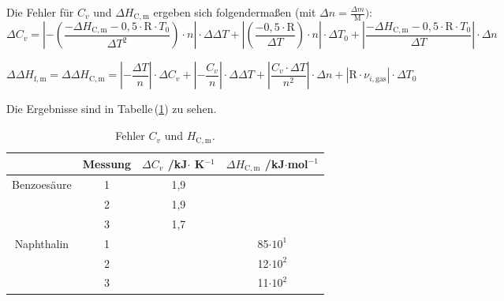 \documentclass[12pt,a4paper,titlepage,headinclude,bibtotoc]{scrartcl}
\begin{document}
Die Fehler für $C_{v}$ und $\Delta H_\mathrm{C,m}$  ergeben sich folgendermaßen (mit $\Delta n= \frac{\Delta m}{\mathrm{M}})$:\\

\begin{equation}
\Delta C_{v}= \left|-\left(\frac{-\Delta H_\mathrm{C,m}-0,5 \cdot \mathrm{R}\cdot T_0}{\Delta T^2}\right) \cdot n\right|\cdot \Delta \Delta T + \left|\left(\frac{-0,5 \cdot \mathrm{R}}{\Delta T}\right) \cdot n\right| \cdot \Delta T_0+ \left|\frac{-\Delta H_\mathrm{C,m}-0,5 \cdot \mathrm{R}\cdot T_0}{\Delta T}\right|\cdot \Delta n
\end{equation}


\begin{equation}
\Delta \Delta H_\mathrm{f,m}=\Delta \Delta H_\mathrm{C,m}=\left|-\frac{\Delta T}{n}\right|\cdot \Delta C_v +\left|-\frac{C_v}{n}\right| \cdot \Delta\Delta T + \left|\frac{C_v \cdot \Delta T}{n^2}\right|\cdot \Delta n +\left|\mathrm{R}\cdot \nu_{i,\mathrm{gas}}\right| \cdot \Delta T_0
\end{equation}

Die Ergebnisse sind in Tabelle\,(\ref{TabBerechneteFehler}) zu sehen.\\


\begin{table}[ht!]\centering  \caption{Fehler $C_v$ und $H_\mathrm{C,m}$.}\label{TabBerechneteFehler}
\begin{tabular}{c|c|c|c} 
 & Messung & $\Delta C_{v}$ /kJ$\cdot$ K$^{-1}$ & $\Delta H_\mathrm{C,m}$ /kJ$\cdot$mol$^{-1}$\\ 
\hline 
Benzoesäure & 1 & 1,9 &  \\ 
\hline 
 & 2 & 1,9 &  \\ 
\hline 
 & 3 & 1,7 &  \\ 
\hline 
Naphthalin & 1 &  & 85$\cdot 10^1$ \\ 
\hline 
 & 2 &  & 12$\cdot 10^2$ \\ 
\hline 
 & 3 & & 11$\cdot 10^2$ \\ 
\end{tabular} 
\end{table}
\FloatBarrier
\end{document}

